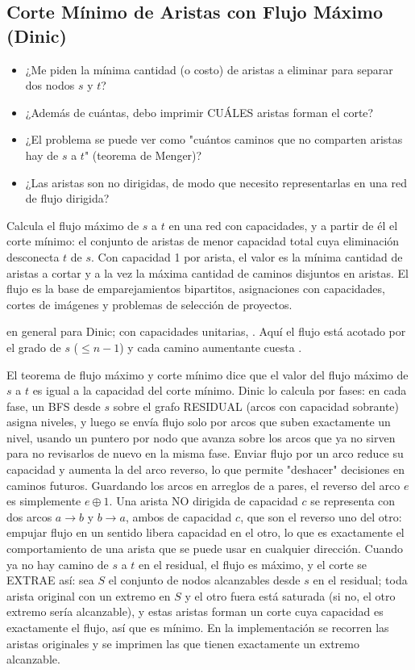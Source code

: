 \subsection{Corte Mínimo de Aristas con Flujo Máximo (Dinic)}
\label{alg:4-18}


\begin{itemize}
\item ¿Me piden la mínima cantidad (o costo) de aristas a eliminar para separar dos nodos $s$ y $t$?
\item ¿Además de cuántas, debo imprimir CUÁLES aristas forman el corte?
\item ¿El problema se puede ver como "cuántos caminos que no comparten aristas hay de $s$ a $t$" (teorema de Menger)?
\item ¿Las aristas son no dirigidas, de modo que necesito representarlas en una red de flujo dirigida?
\end{itemize}

 Calcula el flujo máximo de $s$ a $t$ en una red con capacidades, y a partir de él el corte mínimo: el conjunto de aristas de menor capacidad total cuya eliminación desconecta $t$ de $s$. Con capacidad 1 por arista, el valor es la mínima cantidad de aristas a cortar y a la vez la máxima cantidad de caminos disjuntos en aristas. El flujo es la base de emparejamientos bipartitos, asignaciones con capacidades, cortes de imágenes y problemas de selección de proyectos.

  en general para Dinic; con capacidades unitarias, . Aquí el flujo está acotado por el grado de $s$ ($\le n - 1$) y cada camino aumentante cuesta .

 El teorema de flujo máximo y corte mínimo dice que el valor del flujo máximo de $s$ a $t$ es igual a la capacidad del corte mínimo. Dinic lo calcula por fases: en cada fase, un BFS desde $s$ sobre el grafo RESIDUAL (arcos con capacidad sobrante) asigna niveles, y luego se envía flujo solo por arcos que suben exactamente un nivel, usando un puntero por nodo que avanza sobre los arcos que ya no sirven para no revisarlos de nuevo en la misma fase. Enviar flujo por un arco reduce su capacidad y aumenta la del arco reverso, lo que permite "deshacer" decisiones en caminos futuros. Guardando los arcos en arreglos de a pares, el reverso del arco $e$ es simplemente $e \oplus 1$. Una arista NO dirigida de capacidad $c$ se representa con dos arcos $a \to b$ y $b \to a$, ambos de capacidad $c$, que son el reverso uno del otro: empujar flujo en un sentido libera capacidad en el otro, lo que es exactamente el comportamiento de una arista que se puede usar en cualquier dirección. Cuando ya no hay camino de $s$ a $t$ en el residual, el flujo es máximo, y el corte se EXTRAE así: sea $S$ el conjunto de nodos alcanzables desde $s$ en el residual; toda arista original con un extremo en $S$ y el otro fuera está saturada (si no, el otro extremo sería alcanzable), y estas aristas forman un corte cuya capacidad es exactamente el flujo, así que es mínimo. En la implementación se recorren las aristas originales y se imprimen las que tienen exactamente un extremo alcanzable.~\cite{dinic1970}

